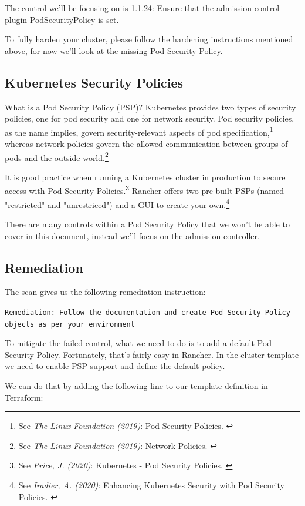 The control we'll be focusing on is 1.1.24: Ensure that the admission control plugin PodSecurityPolicy is set.

To fully harden your cluster, please follow the hardening instructions mentioned above, for now we'll look at the missing Pod Security Policy.

\subsection{Kubernetes Security Policies}

What is a Pod Security Policy (PSP)? Kubernetes provides two types of security policies, one for pod security and one for network security. Pod security policies, as the name implies, govern security-relevant aspects of pod specification,\footnote{See \textit{The Linux Foundation (2019)}: Pod Security Policies. \cite{podSecurity}} whereas network policies govern the allowed communication between groups of pods and the outside world.\footnote{See \textit{The Linux Foundation (2019)}: Network Policies. \cite{netSecurity}}

It is good practice when running a Kubernetes cluster in production to secure access with Pod Security Policies.\footnote{See \textit{Price, J. (2020)}: Kubernetes - Pod Security Policies. \cite{examplePsp}} Rancher offers two pre-built PSPs (named "restricted" and "unrestriced") and a GUI to create your own.\footnote{See \textit{Iradier, A. (2020)}: Enhancing Kubernetes Security with Pod Security Policies. \cite{detailPsp}}

There are many controls within a Pod Security Policy that we won't be able to cover in this document, instead we'll focus on the admission controller.

\subsection{Remediation}

The scan gives us the following remediation instruction:

\verb|Remediation: Follow the documentation and create Pod Security Policy objects as per your environment|

To mitigate the failed control, what we need to do is to add a default Pod Security Policy. Fortunately, that's fairly easy in Rancher. In the cluster template we need to enable PSP support and define the default policy.

We can do that by adding the following line to our template definition in Terraform:

